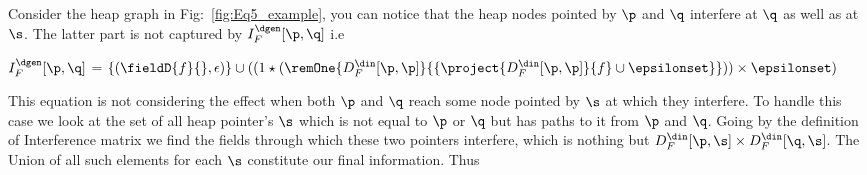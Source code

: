 \begin{itemize}
%
%
%
%
%
%
%
%    



Consider the heap graph in Fig:~\ref{fig:Eq5_example}, you can notice that the heap nodes pointed by $\p$ and $\q$ interfere at $\q$ as well as
at $\s$. The latter part is not captured by  $I_F^{\dgen}[\p, \q]$ i.e 

$I_F^{\dgen}[\p, \q]$ = $\{(\fieldD{f}{}, \epsilon)\}
  \cup ((1 \star (\remOne{D_F^{\din}[\p,
      \p]}{ \{\project{D_F^{\din}[\p,\p]}{f} \cup \epsilonset \} })) \times \epsilonset)$

This equation is not considering the effect when both $\p$ and $\q$ reach some node pointed by $\s$ at which they interfere. 
To handle this case we look at the  set of all heap pointer's $\s$ which is not equal to $\p$ or $\q$ but has paths to it from $\p$ and $\q$.
Going by the definition of Interference matrix we find the fields through which these two pointers interfere, which is nothing but
$D_F^{\din}[\p,\s] \times D_F^{\din}[\q,\s]$. The Union of all such elements for each $\s$ constitute our final information. Thus


\end{itemize}
